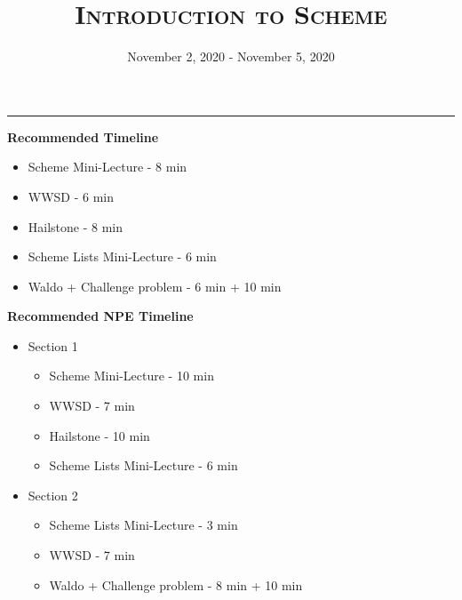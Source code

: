 \documentclass{exam}
\title{\textsc{Introduction to Scheme}}
\date{November 2, 2020 - November 5, 2020}
\begin{document}
\maketitle
\rule{\textwidth}{0.15em}
\fontsize{12}{15}\selectfont

\begin{blocksection}
\begin{guide}
\textbf{Recommended Timeline}
\begin{itemize}
  \item Scheme Mini-Lecture - 8 min
  \item WWSD - 6 min
  \item Hailstone - 8 min
  \item Scheme Lists Mini-Lecture - 6 min
  \item Waldo + Challenge problem - 6 min + 10 min
\end{itemize}
\end{guide}
\end{blocksection}

\begin{blocksection}
\begin{guide}
\textbf{Recommended NPE Timeline}
  \begin{itemize}
  \item Section 1
  \begin{itemize}
    \item Scheme Mini-Lecture - 10 min
    \item WWSD - 7 min
    \item Hailstone - 10 min
    \item Scheme Lists Mini-Lecture - 6 min
  \end{itemize}
  \item Section 2
  \begin{itemize}
    \item Scheme Lists Mini-Lecture - 3 min
    \item WWSD - 7 min
    \item Waldo + Challenge problem - 8 min + 10 min
  \end{itemize}
\end{itemize}
\end{guide}
\end{blocksection}
\end{document}
